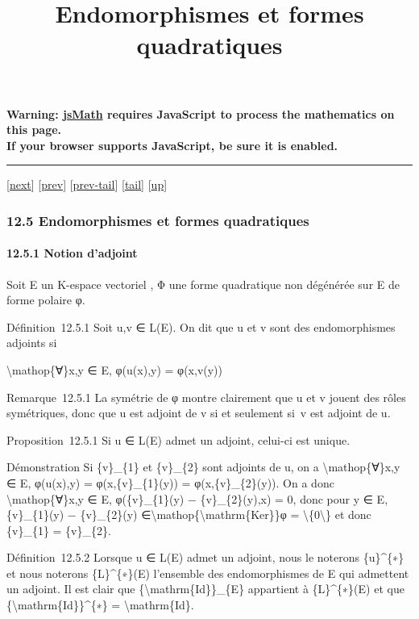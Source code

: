 \documentclass[]{article}
\title{Endomorphismes et formes quadratiques}
\author{}
\date{}
\begin{document}
\maketitle

\textbf{Warning: \href{http://www.math.union.edu/locate/jsMath}{jsMath}
requires JavaScript to process the mathematics on this page.\\ If your
browser supports JavaScript, be sure it is enabled.}

\begin{center}\rule{3in}{0.4pt}\end{center}

{[}\href{coursse72.html}{next}{]} {[}\href{coursse70.html}{prev}{]}
{[}\href{coursse70.html\#tailcoursse70.html}{prev-tail}{]}
{[}\hyperref[tailcoursse71.html]{tail}{]}
{[}\href{coursch13.html\#coursse71.html}{up}{]}

\subsubsection{12.5 Endomorphismes et formes quadratiques}

\paragraph{12.5.1 Notion d'adjoint}

Soit E un K-espace vectoriel , Φ une forme quadratique non dégénérée sur
E de forme polaire φ.

Définition~12.5.1 Soit u,v ∈ L(E). On dit que u et v sont des
endomorphismes adjoints si

\textbackslash{}mathop\{∀\}x,y ∈ E, φ(u(x),y) = φ(x,v(y))

Remarque~12.5.1 La symétrie de φ montre clairement que u et v jouent des
rôles symétriques, donc que u est adjoint de v si et seulement si~v est
adjoint de u.

Proposition~12.5.1 Si u ∈ L(E) admet un adjoint, celui-ci est unique.

Démonstration Si \{v\}\_\{1\} et \{v\}\_\{2\} sont adjoints de u, on a
\textbackslash{}mathop\{∀\}x,y ∈ E, φ(u(x),y) = φ(x,\{v\}\_\{1\}(y)) =
φ(x,\{v\}\_\{2\}(y)). On a donc \textbackslash{}mathop\{∀\}x,y ∈ E,
φ(\{v\}\_\{1\}(y) − \{v\}\_\{2\}(y),x) = 0, donc pour y ∈ E,
\{v\}\_\{1\}(y) − \{v\}\_\{2\}(y)
∈\textbackslash{}mathop\{\textbackslash{}mathrm\{Ker\}\}φ =
\textbackslash{}\{0\textbackslash{}\} et donc \{v\}\_\{1\} =
\{v\}\_\{2\}.

Définition~12.5.2 Lorsque u ∈ L(E) admet un adjoint, nous le noterons
\{u\}\^{}\{∗\} et nous noterons \{L\}\^{}\{∗\}(E) l'ensemble des
endomorphismes de E qui admettent un adjoint. Il est clair que
\{\textbackslash{}mathrm\{Id\}\}\_\{E\} appartient à \{L\}\^{}\{∗\}(E)
et que \{\textbackslash{}mathrm\{Id\}\}\^{}\{∗\} =
\textbackslash{}mathrm\{Id\}.
\end{document}
